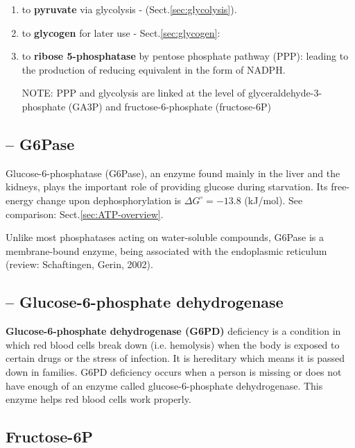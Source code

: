 \begin{enumerate}
  \item to {\bf pyruvate} via glycolysis -  (Sect.\ref{sec:glycolysis}).
  
  \item to {\bf glycogen} for later use - Sect.\ref{sec:glycogen}: 
  
  
  \item to {\bf ribose 5-phosphatase} by pentose phosphate pathway (PPP): 
  leading to the production of reducing equivalent in the form of NADPH.

NOTE: PPP and glycolysis are linked at the level of glyceraldehyde-3-phosphate
(GA3P) and fructose-6-phosphate (fructose-6P)

\end{enumerate}

\subsection{-- G6Pase}
\label{sec:Glucose-6-phosphatase}

Glucose-6-phosphatase (G6Pase), an enzyme found mainly in the liver and the
kidneys, plays the important role of providing glucose during starvation.
Its free-energy change upon dephosphorylation is $\Delta G^\circ = -13.8 $
(kJ/mol). See comparison: Sect.\ref{sec:ATP-overview}.

Unlike most phosphatases acting on water-soluble compounds, G6Pase is a
membrane-bound enzyme, being associated with the endoplasmic reticulum (review:
Schaftingen, Gerin, 2002).

\subsection{-- Glucose-6-phosphate dehydrogenase}
\label{sec:Glucose-6-phosphate-dehydrogenase}

{\bf Glucose-6-phosphate dehydrogenase (G6PD)} deficiency is a condition in
which red blood cells break down (i.e. hemolysis) when the body is exposed to
certain drugs or the stress of infection. It is hereditary which means it is passed down in
families. G6PD deficiency occurs when a person is missing or does not have
enough of an enzyme called glucose-6-phosphate dehydrogenase. This enzyme helps
red blood cells work properly.

\subsection{Fructose-6P}
\label{sec:Fructose-6P}
\label{sec:Fructose-6-phosphate}

